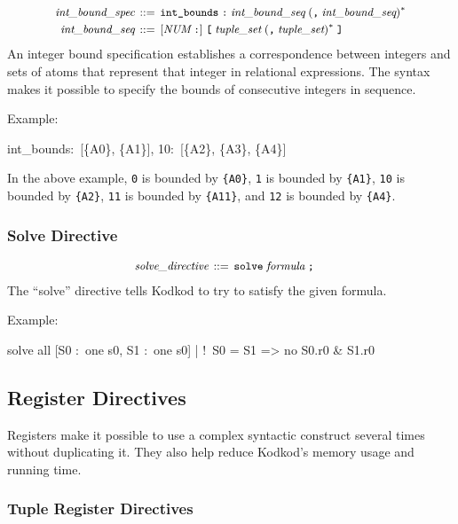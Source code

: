 \documentclass[a4paper,12pt]{article}
\begin{document}
$$\small\begin{aligned}
\textit{int\_bound\_spec} &\,::=\, \verb|int_bounds|\; \verb|:|\; \textit{int\_bound\_seq}\; (\verb|,|\; \textit{int\_bound\_seq})^* \\
\textit{int\_bound\_seq} & \,::=\, [\textit{NUM}\;\verb|:|]\;\verb|[|\; \textit{tuple\_set}\; (\verb|,|\; \textit{tuple\_set})^*\; \verb|]|
\end{aligned}$$
%
An integer bound specification establishes a correspondence between integers and
sets of atoms that represent that integer in relational expressions. The syntax
makes it possible to specify the bounds of consecutive integers in sequence.

Example:

\pre
\ttfamily\small
int\_bounds:~[\{A0\}, \{A1\}], 10:~[\{A2\}, \{A3\}, \{A4\}]
\post

In the above example, \verb|0| is bounded by \verb|{A0}|, \verb|1| is bounded by
\verb|{A1}|, \verb|10| is bounded by \verb|{A2}|, \verb|11| is bounded by
\verb|{A11}|, and \verb|12| is bounded by \verb|{A4}|.

\subsubsection{Solve Directive}
\label{solve-directive}

$$\small\begin{aligned}
\textit{solve\_directive} \,::=\, {}& \verb|solve|\; \textit{formula}\; \verb|;|
\end{aligned}$$
%
The ``solve'' directive tells Kodkod to try to satisfy the given formula.

Example:

\pre
\ttfamily\small
solve all [S0 :~one s0, S1 :~one s0] | !~S0 = S1 => no S0.r0 \& S1.r0
\post

\subsection{Register Directives}
\label{register-directives}

Registers make it possible to use a complex syntactic construct several times
without duplicating it. They also help reduce Kodkod's memory usage and running
time.

\subsubsection{Tuple Register Directives}
\label{tuple-register-directives}
\end{document}
